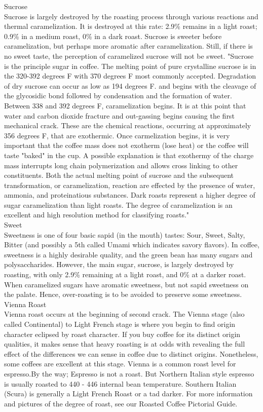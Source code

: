 \documentclass[10pt,twoside,footinclude=true,headinclude=true]{scrbook} %
\begin{document}
\begin{multicols}{2}
\medskip
{\smallcaps \small Sucrose}\\
Sucrose is largely destroyed by the roasting process through various reactions and thermal caramelization. It is destroyed at this rate: 2.9\% remains in a light roast; 0.9\% in a medium roast, 0\% in a dark roast. Sucrose is sweeter before caramelization, but perhaps more aromatic after caramelization. Still, if there is no sweet taste, the perception of caramelized sucrose will not be sweet. "Sucrose is the principle sugar in coffee. The melting point of pure crystalline sucrose is in the 320-392 degrees F with 370 degrees F most commonly accepted. Degradation of dry sucrose can occur as low as 194 degrees F. and begins with the cleavage of the glycosidic bond followed by condensation and the formation of water. Between 338 and 392 degrees F, caramelization begins. It is at this point that water and carbon dioxide fracture and out-gassing begins causing the first mechanical crack. These are the chemical reactions, occurring at approximately 356 degrees F, that are exothermic. Once carmelization begins, it is very important that the coffee mass does not exotherm (lose heat) or the coffee will taste "baked" in the cup. A possible explanation is that exothermy of the charge mass interrupts long chain polymerization and allows cross linking to other constituents. Both the actual melting point of sucrose and the subsequent transformation, or caramelization, reaction are effected by the presence of water, ammonia, and proteinatious substances. Dark roasts represent a higher degree of sugar caramelization than light roasts. The degree of caramelization is an excellent and high resolution method for classifying roasts."\\
\medskip
{\smallcaps \small Sweet}\\
Sweetness is one of four basic sapid (in the mouth) tastes: Sour, Sweet, Salty, Bitter (and possibly a 5th called Umami which indicates savory flavors). In coffee, sweetness is a highly desirable quality, and the green bean has many sugars and polysaccharides. However, the main sugar, sucrose, is largely destroyed by roasting, with only 2.9\% remaining at a light roast, and 0\% at a darker roast. When caramelized sugars have aromatic sweetness, but not sapid sweetness on the palate. Hence, over-roasting is to be avoided to preserve some sweetness.\\
\medskip
{\smallcaps \small Vienna Roast}\\
Vienna roast occurs at the beginning of second crack. The Vienna stage (also called Continental) to Light French stage is where you begin to find origin character eclipsed by roast character. If you buy coffee for its distinct origin qualities, it makes sense that heavy roasting is at odds with revealing the full effect of the differences we can sense in coffee due to distinct origins. Nonetheless, some coffees are excellent at this stage. Vienna is a common roast level for espresso.By the way; Espresso is not a roast. But Northern Italian style espresso is usually roasted to 440 - 446 internal bean temperature. Southern Italian (Scura) is generally a Light French Roast or a tad darker. For more information and pictures of the degree of roast, see our  Roasted Coffee Pictorial Guide.\\

\end{multicols}
\end{document}
